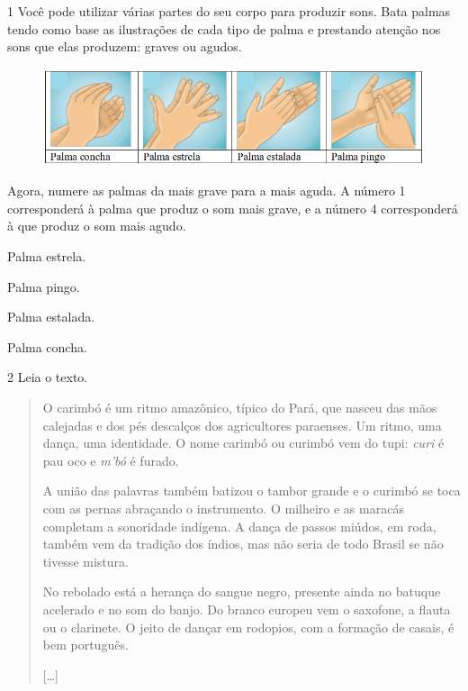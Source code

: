 
\num{1} Você pode utilizar várias partes do seu corpo para produzir sons.
Bata palmas tendo como base as ilustrações de cada tipo de palma e
prestando atenção nos sons que elas produzem: graves ou agudos.

\begin{figure}[htpb!]
\includegraphics[width=\textwidth]{./imgs/art1.png}
\end{figure}

Agora, numere as palmas da mais grave para a mais aguda. A número 1
corresponderá à palma que produz o som mais grave, e a número 4 corresponderá à que
produz o som mais agudo.

\begin{boxlist}
 Palma estrela.

 Palma pingo.

 Palma estalada.

 Palma concha.
\end{boxlist}


\num{2}  Leia o texto.

\begin{quote}
O carimbó é um ritmo amazônico, típico do Pará, que nasceu das mãos
calejadas e dos pés descalços dos agricultores paraenses. Um ritmo, uma
dança, uma identidade. O nome carimbó ou curimbó vem do tupi:
\emph{curi} é pau oco e \emph{m'bó} é furado.

A união das palavras também batizou o tambor grande e o curimbó se toca
com as pernas abraçando o instrumento. O milheiro e as maracás completam
a sonoridade indígena. A dança de passos miúdos, em roda, também vem da
tradição dos índios, mas não seria de todo Brasil se não tivesse
mistura.

No rebolado está a herança do sangue negro, presente ainda no batuque
acelerado e no som do banjo. Do branco europeu vem o saxofone, a flauta
ou o clarinete. O jeito de dançar em rodopios, com a formação de casais,
é bem português.

{[}\ldots{}{]}

\end{quote}

